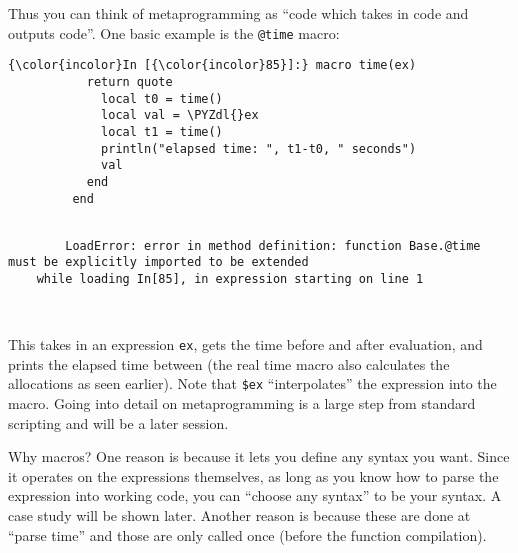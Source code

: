 \documentclass[11pt]{article}
\def\PYZdl{\char`\$}
\begin{document}
Thus you can think of metaprogramming as ``code which takes in code and
outputs code''. One basic example is the \texttt{@time} macro:

    \begin{Verbatim}[commandchars=\\\{\}]
{\color{incolor}In [{\color{incolor}85}]:} macro time(ex)
           return quote
             local t0 = time()
             local val = \PYZdl{}ex
             local t1 = time()
             println("elapsed time: ", t1-t0, " seconds")
             val
           end
         end
\end{Verbatim}

    \begin{Verbatim}[commandchars=\\\{\}]

        LoadError: error in method definition: function Base.@time must be explicitly imported to be extended
    while loading In[85], in expression starting on line 1

        

    \end{Verbatim}

    This takes in an expression \texttt{ex}, gets the time before and after
evaluation, and prints the elapsed time between (the real time macro
also calculates the allocations as seen earlier). Note that
\texttt{\$ex} ``interpolates'' the expression into the macro. Going into
detail on metaprogramming is a large step from standard scripting and
will be a later session.

Why macros? One reason is because it lets you define any syntax you
want. Since it operates on the expressions themselves, as long as you
know how to parse the expression into working code, you can ``choose any
syntax'' to be your syntax. A case study will be shown later. Another
reason is because these are done at ``parse time'' and those are only
called once (before the function compilation).


    
    
    
    
\end{document}
